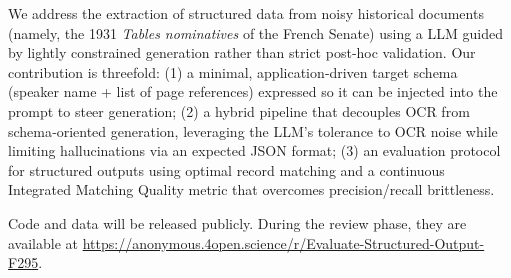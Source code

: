 We address the extraction of structured data from noisy historical documents (namely, the 1931 \textit{Tables nominatives} of the French Senate) using a LLM guided by lightly constrained generation rather than strict post‑hoc validation. Our contribution is threefold: (1) a minimal, application‑driven target schema (speaker name + list of page references) expressed so it can be injected into the prompt to steer generation; (2) a hybrid pipeline that decouples OCR from schema‑oriented generation, leveraging the LLM’s tolerance to OCR noise while limiting hallucinations via an expected JSON format; (3) an evaluation protocol for structured outputs using optimal record matching and a continuous Integrated Matching Quality metric that overcomes precision/recall brittleness.


Code and data will be released publicly. During the review phase, they are available at \url{https://anonymous.4open.science/r/Evaluate-Structured-Output-F295}.